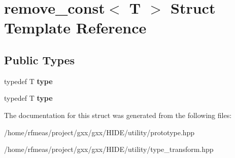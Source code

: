 \hypertarget{structremove__const}{}\section{remove\+\_\+const$<$ T $>$ Struct Template Reference}
\label{structremove__const}
\subsection*{Public Types}
\begin{DoxyCompactItemize}
\item 
typedef T {\bfseries type}\hypertarget{structremove__const_a9f0ed27650a6d0c46dbbcee3d241b8dc}{}\label{structremove__const_a9f0ed27650a6d0c46dbbcee3d241b8dc}

\item 
typedef T {\bfseries type}\hypertarget{structremove__const_a9f0ed27650a6d0c46dbbcee3d241b8dc}{}\label{structremove__const_a9f0ed27650a6d0c46dbbcee3d241b8dc}

\end{DoxyCompactItemize}


The documentation for this struct was generated from the following files\+:\begin{DoxyCompactItemize}
\item 
/home/rfmeas/project/gxx/gxx/\+H\+I\+D\+E/utility/prototype.\+hpp\item 
/home/rfmeas/project/gxx/gxx/\+H\+I\+D\+E/utility/type\+\_\+transform.\+hpp\end{DoxyCompactItemize}
